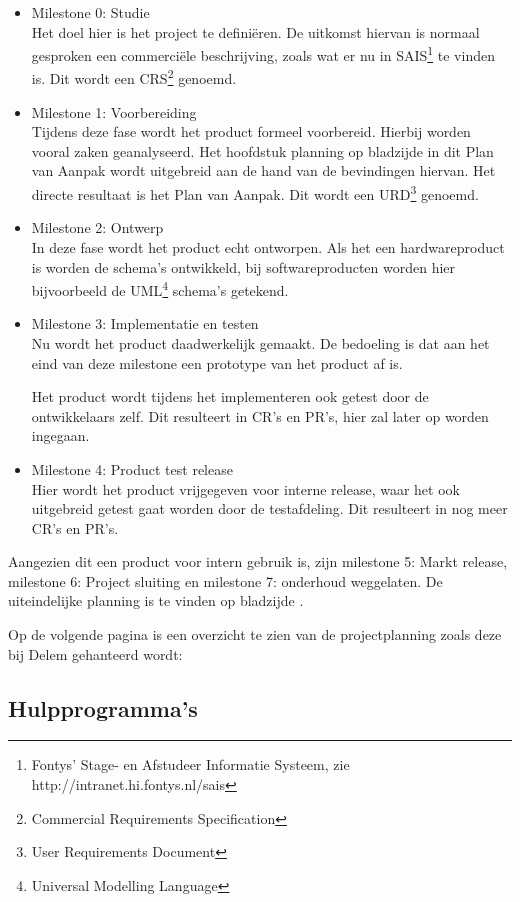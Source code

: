 \begin{itemize}
\item Milestone 0: Studie\\
Het doel hier is het project te defini\"eren. De uitkomst hiervan is normaal gesproken een commerci\"ele beschrijving, zoals wat er nu in SAIS\footnote{Fontys' Stage- en Afstudeer Informatie Systeem, zie http://intranet.hi.fontys.nl/sais} te vinden is. Dit wordt een CRS\footnote{Commercial Requirements Specification} genoemd.
\item Milestone 1: Voorbereiding\\
Tijdens deze fase wordt het product formeel voorbereid. Hierbij worden vooral zaken geanalyseerd. Het hoofdstuk planning op bladzijde \pageref{planning} in dit Plan van Aanpak wordt uitgebreid aan de hand van de bevindingen hiervan. Het directe resultaat is het Plan van Aanpak. Dit wordt een URD\footnote{User Requirements Document} genoemd.
\item Milestone 2: Ontwerp\\
In deze fase wordt het product echt ontworpen. Als het een hardwareproduct is worden de schema's ontwikkeld, bij softwareproducten worden hier bijvoorbeeld de UML\footnote{Universal Modelling Language} schema's getekend.
\item Milestone 3: Implementatie en testen\\
Nu wordt het product daadwerkelijk gemaakt. De bedoeling is dat aan het eind van deze milestone een prototype van het product af is.

Het product wordt tijdens het implementeren ook getest door de ontwikkelaars zelf. Dit resulteert in CR's en PR's, hier zal later op worden ingegaan.
\item Milestone 4: Product test release\\
Hier wordt het product vrijgegeven voor interne release, waar het ook uitgebreid getest gaat worden door de testafdeling. Dit resulteert in nog meer CR's en PR's.
\end{itemize}

Aangezien dit een product voor intern gebruik is, zijn milestone 5: Markt release, milestone 6: Project sluiting en milestone 7: onderhoud weggelaten. De uiteindelijke planning is te vinden op bladzijde \pageref{planning}.

Op de volgende pagina is een overzicht te zien van de projectplanning zoals deze bij Delem gehanteerd wordt:

\subsection{Hulpprogramma's}

